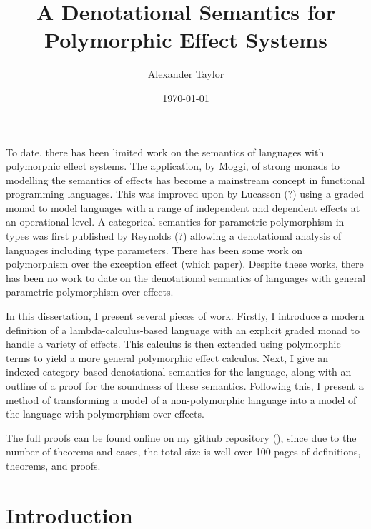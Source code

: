 \documentclass{Report}
\title{A Denotational Semantics for Polymorphic Effect Systems}
\date{\today}
\author{Alexander Taylor}
\begin{document}
\maketitle



\abstract
To date, there has been limited work on the semantics of languages with polymorphic effect systems. The application, by Moggi, of strong monads to modelling the semantics of effects has become a mainstream concept in functional programming languages. This was improved upon by Lucasson (?) using a graded monad to model languages with a range of independent and dependent effects at an operational level. A categorical semantics for parametric polymorphism in types was first published by Reynolds (?) allowing a denotational analysis of languages including type parameters. There has been some work on polymorphism over the exception effect (which paper). Despite these works, there has been no work to date on the denotational semantics of languages with general parametric polymorphism over effects.

In this dissertation, I present several pieces of work. Firstly, I introduce a modern definition of a lambda-calculus-based language with an explicit graded monad to handle a variety of effects. This calculus is then extended using polymorphic terms to yield a more general polymorphic effect calculus. Next, I give an indexed-category-based denotational semantics for the language, along with an outline of a proof for the soundness of these semantics. Following this, I present a method of transforming a model of a non-polymorphic language into a model of the language with polymorphism over effects.

The full proofs can be found online on my github repository (), since due to the number of theorems and cases, the total size is well over 100 pages of definitions, theorems, and proofs.

\tableofcontents

\chapter{Introduction}


    
\end{document}
